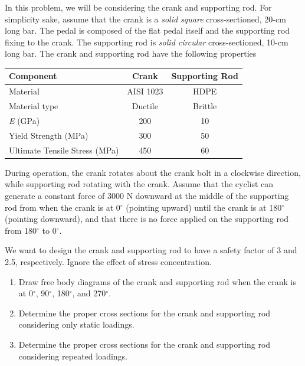 \documentclass[
10pt,
a4paper,
openany,
svgnames,
]{book}
\begin{document}
\begin{exercises}
\begin{center}
  \end{center}
  
  In this problem, we will be considering the crank and supporting rod. For simplicity sake, assume that the crank is a  \emph{solid square} cross-sectioned, 20-cm long bar. The pedal is composed of the flat pedal itself and the supporting rod fixing to the crank. The supporting rod is \emph{solid circular} cross-sectioned, 10-cm long bar.  The crank and supporting rod have the following properties
  
  \begin{center}
    \begin{tabular}{ l c c }
      \toprule
      Component	&	Crank	&	Supporting Rod \\
      \midrule
      Material	&	AISI 1023	&	HDPE	\\
      Material type & Ductile	&	Brittle \\
      \emph{E} (GPa)	&	200	&	10	\\
      Yield Strength (MPa)	&	300	&	 50	\\
      Ultimate Tensile Stress (MPa)	&	450	&	60	\\
      \bottomrule
    \end{tabular}
  \end{center}
  
  During operation, the crank rotates about the crank bolt in a clockwise direction, while supporting rod rotating with the crank. Assume that the cyclist can generate a constant force of 3000 N downward at the middle of the supporting rod from when the crank is at 0$^{\circ}$ (pointing upward) until the crank is at 180$^{\circ}$ (pointing downward), and that there is no force applied on the supporting rod from 180$^{\circ}$ to 0$^{\circ}$.
  
  We want to design the crank and supporting rod to have a safety factor of 3 and 2.5, respectively. Ignore the effect of stress concentration.
  
  \begin{enumerate}
  \item Draw free body diagrams of the crank and supporting rod when the crank is at 0$^{\circ}$, 90$^{\circ}$, 180$^{\circ}$, and 270$^{\circ}$.
  \item Determine the proper cross sections for the crank and supporting rod considering only static loadings.
  \item Determine the proper cross sections for the crank and supporting rod considering repeated loadings.
  \end{enumerate}


\end{exercises}
\end{document}
